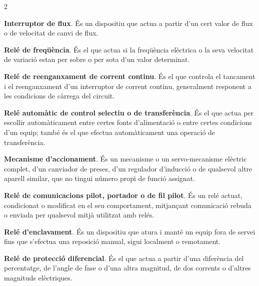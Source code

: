 \begin{multicols}{2}
\begin{list}{}
		\item[\textbf{80}]   
		\textbf{Interruptor de flux}. És un dispositiu que actua a partir d'un cert valor de flux o de velocitat de canvi de flux.
		
		\item[\textbf{81}]   
		\textbf{Relé de freqüència}. És el que actua
		si la freqüència elèctrica o la seva velocitat de variació estan per sobre o per sota d'un valor determinat.
		
		\item[\textbf{82}]   
		\textbf{Relé de reenganxament de corrent continu}. És el que controla el tancament i el reenganxament d'un
		interruptor de corrent continu, generalment responent a les condicions de càrrega del
		circuit.
		
		\item[\textbf{83}]  
		\textbf{Relé automàtic de control selectiu o de transferència}. És
		el que actua per escollir automàticament entre certes fonts
		d'alimentació o entre certes condicions d'un equip; també és el que
		efectua automàticament una operació de transferència.
		
		\item[\textbf{84}]   
		\textbf{Mecanisme d'accionament}. És un
		mecanisme o un servo-mecanisme elèctric complet,  d'un canviador de
		preses, d'un regulador d'inducció o de qualsevol altre aparell
		similar, que no tingui número propi de funció assignat.
		
		\item[\textbf{85}]   
		\textbf{Relé de comunicacions pilot, portador o de fil pilot}. És un relé actuat, condicionat o modificat en el seu comportament, mitjançant comunicació rebuda o enviada per qualsevol mitjà utilitzat amb relés.
		
		\item[\textbf{86}]   
		\textbf{Relé d'enclavament}. És un dispositiu que atura i manté un equip fora de servei fins que s'efectua una reposició manual, sigui localment o remotament.
		
		\item[\textbf{87}]   
		\textbf{Relé de protecció diferencial}. És el que actua a partir d'una diferència  del percentatge, de l'angle de fase o d'una altra magnitud, de dos corrents
		o d'altres magnituds elèctriques.
		

\end{list}
\end{multicols}
